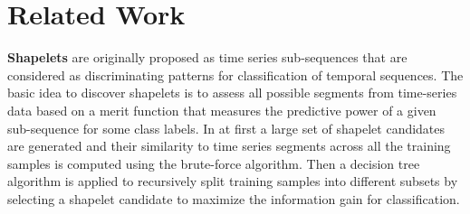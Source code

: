 \section{Related Work}
\label{sec:related-work}


\textbf{Shapelets}\cite{Ye:2009:TSS:1557019.1557122} are originally proposed as time series sub-sequences that are considered as discriminating patterns for classification of temporal sequences.  The basic idea to discover shapelets is to assess all possible segments from time-series data based on a merit function that measures the predictive power of a given sub-sequence for some class labels. In \cite{Ye:2009:TSS:1557019.1557122} at first a large set of shapelet candidates are generated and their similarity to time series segments across all the training samples is computed using the brute-force algorithm. Then a decision tree algorithm is applied to recursively split training samples into different subsets by selecting a shapelet candidate to maximize the information gain for classification.

